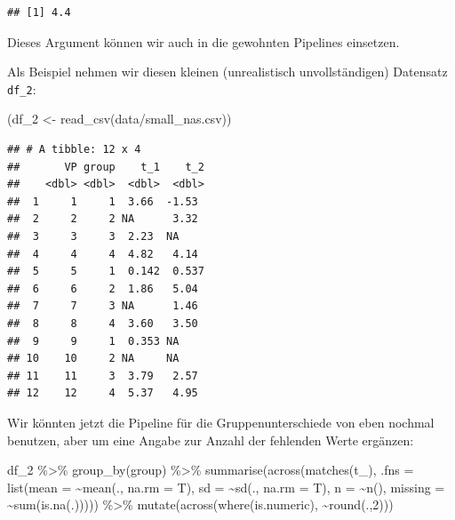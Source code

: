 \documentclass[
]{book}
\newenvironment{Shaded}{\begin{snugshade}}{\end{snugshade}}
\newcommand{\AttributeTok}[1]{\textcolor[rgb]{0.77,0.63,0.00}{#1}}
\newcommand{\DecValTok}[1]{\textcolor[rgb]{0.00,0.00,0.81}{#1}}
\newcommand{\FunctionTok}[1]{\textcolor[rgb]{0.00,0.00,0.00}{#1}}
\newcommand{\NormalTok}[1]{#1}
\newcommand{\OtherTok}[1]{\textcolor[rgb]{0.56,0.35,0.01}{#1}}
\newcommand{\SpecialCharTok}[1]{\textcolor[rgb]{0.00,0.00,0.00}{#1}}
\newcommand{\StringTok}[1]{\textcolor[rgb]{0.31,0.60,0.02}{#1}}
\begin{document}
\begin{verbatim}
## [1] 4.4
\end{verbatim}

Dieses Argument können wir auch in die gewohnten Pipelines einsetzen.

Als Beispiel nehmen wir diesen kleinen (unrealistisch unvollständigen) Datensatz \texttt{df\_2}:

\begin{Shaded}
\begin{Highlighting}[]
\NormalTok{(df\_2 }\OtherTok{\textless{}{-}} \FunctionTok{read\_csv}\NormalTok{(}\StringTok{\textquotesingle{}data/small\_nas.csv\textquotesingle{}}\NormalTok{))}
\end{Highlighting}
\end{Shaded}

\begin{verbatim}
## # A tibble: 12 x 4
##       VP group    t_1    t_2
##    <dbl> <dbl>  <dbl>  <dbl>
##  1     1     1  3.66  -1.53 
##  2     2     2 NA      3.32 
##  3     3     3  2.23  NA    
##  4     4     4  4.82   4.14 
##  5     5     1  0.142  0.537
##  6     6     2  1.86   5.04 
##  7     7     3 NA      1.46 
##  8     8     4  3.60   3.50 
##  9     9     1  0.353 NA    
## 10    10     2 NA     NA    
## 11    11     3  3.79   2.57 
## 12    12     4  5.37   4.95
\end{verbatim}

Wir könnten jetzt die Pipeline für die Gruppenunterschiede von eben nochmal benutzen, aber um eine Angabe zur Anzahl der fehlenden Werte ergänzen:

\begin{Shaded}
\begin{Highlighting}[]
\NormalTok{df\_2 }\SpecialCharTok{\%\textgreater{}\%} 
  \FunctionTok{group\_by}\NormalTok{(group) }\SpecialCharTok{\%\textgreater{}\%} 
  \FunctionTok{summarise}\NormalTok{(}\FunctionTok{across}\NormalTok{(}\FunctionTok{matches}\NormalTok{(}\StringTok{\textquotesingle{}t\_\textquotesingle{}}\NormalTok{),}
                   \AttributeTok{.fns =} \FunctionTok{list}\NormalTok{(}\AttributeTok{mean =} \SpecialCharTok{\textasciitilde{}}\FunctionTok{mean}\NormalTok{(., }\AttributeTok{na.rm =}\NormalTok{ T),}
                               \AttributeTok{sd =} \SpecialCharTok{\textasciitilde{}}\FunctionTok{sd}\NormalTok{(., }\AttributeTok{na.rm =}\NormalTok{ T),}
                               \AttributeTok{n =} \SpecialCharTok{\textasciitilde{}}\FunctionTok{n}\NormalTok{(),}
                               \AttributeTok{missing =} \SpecialCharTok{\textasciitilde{}}\FunctionTok{sum}\NormalTok{(}\FunctionTok{is.na}\NormalTok{(.))))) }\SpecialCharTok{\%\textgreater{}\%} 
  \FunctionTok{mutate}\NormalTok{(}\FunctionTok{across}\NormalTok{(}\FunctionTok{where}\NormalTok{(is.numeric),}
                \SpecialCharTok{\textasciitilde{}}\FunctionTok{round}\NormalTok{(.,}\DecValTok{2}\NormalTok{)))}
\end{Highlighting}
\end{Shaded}
\end{document}
